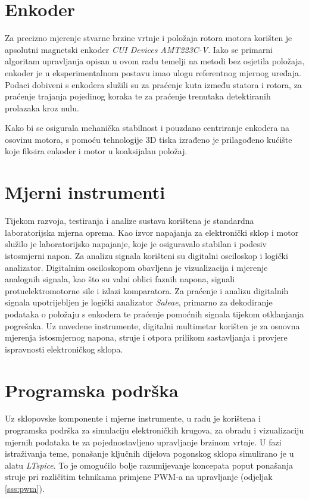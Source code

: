 \documentclass[diplomskirad]{fer}
\begin{document}
\section{Enkoder}
\label{sec:enkoder}

Za precizno mjerenje stvarne brzine vrtnje i položaja rotora motora korišten je
apsolutni magnetski enkoder \textit{CUI Devices AMT223C-V}. Iako se primarni
algoritam upravljanja opisan u ovom radu temelji na metodi bez osjetila
položaja, enkoder je u eksperimentalnom postavu imao ulogu referentnog mjernog
uređaja. Podaci dobiveni s enkodera služili su za praćenje kuta između statora
i rotora, za praćenje trajanja pojedinog koraka te za praćenje trenutaka
detektiranih prolazaka kroz nulu. 

Kako bi se osigurala mehanička stabilnost i pouzdano centriranje enkodera na
osovinu motora, s pomoću tehnologije 3D tiska izrađeno je prilagođeno kućište
koje fiksira enkoder i motor u koaksijalan položaj. 

\section{Mjerni instrumenti}
\label{sec:mjerni_instrumenti}

Tijekom razvoja, testiranja i analize sustava korištena je standardna
laboratorijska mjerna oprema. Kao izvor napajanja za elektronički sklop i motor
služilo je laboratorijsko napajanje, koje je osiguravalo stabilan i podesiv
istosmjerni napon. Za analizu signala korišteni su digitalni osciloskop i
logički analizator. Digitalnim osciloskopom obavljena je vizualizacija i
mjerenje analognih signala, kao što su valni oblici faznih napona, signali
protuelektromotorne sile i izlazi komparatora. Za praćenje i analizu digitalnih
signala upotrijebljen je logički analizator \textit{Saleae}, primarno za
dekodiranje podataka o položaju s enkodera te praćenje pomoćnih signala tijekom
otklanjanja pogrešaka. Uz navedene instrumente, digitalni multimetar korišten
je za osnovna mjerenja istosmjernog napona, struje i otpora prilikom
sastavljanja i provjere ispravnosti elektroničkog sklopa.

\section{Programska podrška}
\label{sec:programska_podrska}

Uz sklopovske komponente i mjerne instrumente, u radu je korištena i programska
podrška za simulaciju elektroničkih krugova, za obradu i vizualizaciju mjernih
podataka te za pojednostavljeno upravljanje brzinom vrtnje. U fazi istraživanja
teme, ponašanje ključnih dijelova pogonskog sklopa simulirano je u alatu
\textit{LTspice}. To je omogućilo bolje razumijevanje koncepata poput ponašanja
struje pri različitim tehnikama primjene PWM-a na upravljanje (odjeljak
\ref{sss:pwm}).
\end{document}

